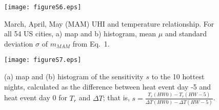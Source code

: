 \begin{figure}
\texttt{[image: figureS6.eps]}
\caption{March, April, May (MAM) UHI and temperature relationship. 
For all 54 US cities, a) map and b) histogram, mean $\mu$ and standard deviation $\sigma$ of $m_{MAM}$ from Eq.~1.}
\end{figure}


\begin{figure}
\texttt{[image: figureS7.eps]}
\caption{(a) map and (b) histogram of the sensitivity $s$ to the 10 hottest nights, calculated as the difference between heat event day -5 and heat event day 0 for $T_r$ and $\Delta T$; that is, $s = \frac{T_r \left(HW 0\right) -T_r \left(HW -5\right)}{\Delta T\left(HW 0\right) - \Delta T\left(HW -5\right)} $.   
}
\end{figure}





